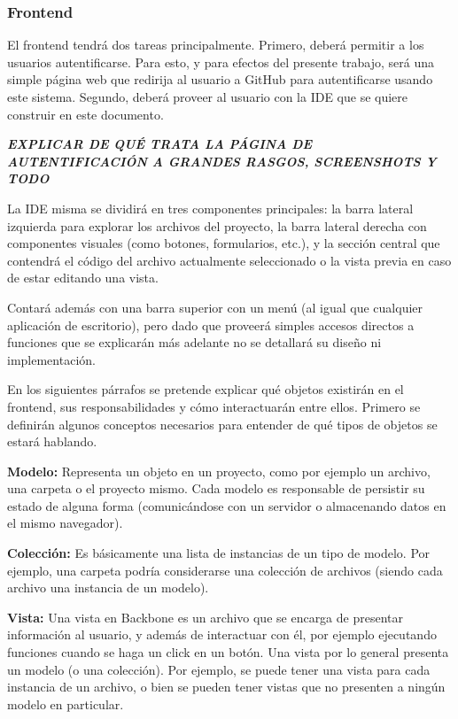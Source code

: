 \documentclass[12pt,titlepage,]{article}
\begin{document}
\subsubsection{Frontend}

El frontend tendrá dos tareas principalmente. Primero, deberá permitir a
los usuarios autentificarse. Para esto, y para efectos del presente
trabajo, será una simple página web que redirija al usuario a GitHub
para autentificarse usando este sistema. Segundo, deberá proveer al
usuario con la IDE que se quiere construir en este documento.

\textbf{\emph{EXPLICAR DE QUÉ TRATA LA PÁGINA DE AUTENTIFICACIÓN A
GRANDES RASGOS, SCREENSHOTS Y TODO}}

La IDE misma se dividirá en tres componentes principales: la barra
lateral izquierda para explorar los archivos del proyecto, la barra
lateral derecha con componentes visuales (como botones, formularios,
etc.), y la sección central que contendrá el código del archivo
actualmente seleccionado o la vista previa en caso de estar editando una
vista.

Contará además con una barra superior con un menú (al igual que
cualquier aplicación de escritorio), pero dado que proveerá simples
accesos directos a funciones que se explicarán más adelante no se
detallará su diseño ni implementación.

En los siguientes párrafos se pretende explicar qué objetos existirán en
el frontend, sus responsabilidades y cómo interactuarán entre ellos.
Primero se definirán algunos conceptos necesarios para entender de qué
tipos de objetos se estará hablando.

\textbf{Modelo:} Representa un objeto en un proyecto, como por ejemplo
un archivo, una carpeta o el proyecto mismo. Cada modelo es responsable
de persistir su estado de alguna forma (comunicándose con un servidor o
almacenando datos en el mismo navegador).

\textbf{Colección:} Es básicamente una lista de instancias de un tipo de
modelo. Por ejemplo, una carpeta podría considerarse una colección de
archivos (siendo cada archivo una instancia de un modelo).

\textbf{Vista:} Una vista en Backbone es un archivo que se encarga de
presentar información al usuario, y además de interactuar con él, por
ejemplo ejecutando funciones cuando se haga un click en un botón. Una
vista por lo general presenta un modelo (o una colección). Por ejemplo,
se puede tener una vista para cada instancia de un archivo, o bien se
pueden tener vistas que no presenten a ningún modelo en particular.
\end{document}
